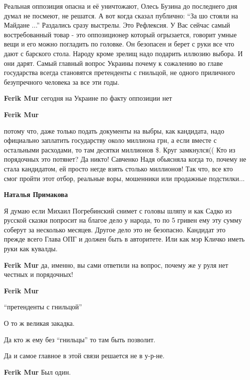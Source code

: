 \begin{itemize}

Реальная оппозиция опасна и её уничтожают, Олесь Бузина до последнего дня думал
не посмеют, не решатся. А вот когда сказал публично: \enquote{За шо стояли на Майдане
...} Раздались сразу выстрелы. Это Рефлексия. У Вас сейчас самый востребованный
товар - это оппозиционер который огрызается, говорит умные вещи и его можно
погладить по головке. Он безопасен и берет с руки все что дают с барского
стола. Народу кроме зрелищ надо подарить иллюзию выбора. И они дарят. Самый
главный вопрос Украины почему к сожалению во главе государства всегда
становятся претенденты с гнильцой, не одного приличного безупречного человека
за все эти годы.

\begin{itemize} %
\textbf{Ferik Mur} сегодня на Украине по факту оппозиции нет

\textbf{Ferik Mur} 

потому что, даже только подать документы на выбры, как кандидата, надо
официально заплатить государству около миллиона грн, а если вместе с остальными
расходами, то там десятки миллионов \$. Круг замкнулся(( Кто из порядочных это
потянет? Да никто! Савченко Надя обьясняла когда то, почему не стала
кандидатом, ей просто негде взять столько миллионов! Так что, все кто смог
пройти этот отбор, реальные воры, мошенники или продажные подстилки...

\textbf{Наталья Примакова} 

Я думаю если Михаил Погребинский снимет с головы шляпу и как Садко из русской
сказки попросит на благое дело у народа, то по 5 гривен ему эту сумму соберут
за несколько месяцев. Другое дело это не безопасно. Кандидат это прежде всего
Глава ОПГ и должен быть в авторитете. Или как мэр Кличко иметь руки как
кувалды.

\textbf{Ferik Mur} да, именно, вы сами ответили на вопрос, почему же у руля нет честных и порядочных!

\textbf{Ferik Mur}

\enquote{претенденты с гнильцой}

О то ж великая закадка.

Да кто ж ему без \enquote{гнильцы} то там быть позволит.

Да и самое главное в этой связи решается не в у-р-не.

\textbf{Ferik Mur} Был один.


\end{itemize}
\end{itemize}
